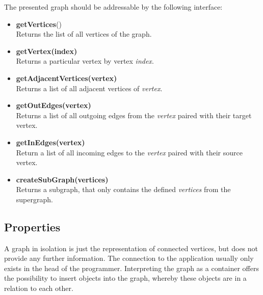 The presented graph should be addressable by the following interface:

\begin{itemize}
  \item \textbf{getVertices}()\\
    Returns the list of all vertices of the graph.
    
  \item  \textbf{getVertex(index)}\\
    Returns a particular vertex by vertex \textit{index}.

  \item  \textbf{getAdjacentVertices(vertex)}\\
    Returns a list of all adjacent vertices of \textit{vertex}.

  \item  \textbf{getOutEdges(vertex)}\\
    Returns a list of all outgoing edges from the \textit{vertex}
    paired with their target vertex.

  \item  \textbf{getInEdges(vertex)}\\
    Return a list of all incoming edges to the \textit{vertex}
    paired with their source vertex.

  \item  \textbf{createSubGraph(vertices)}\\
    Returns a subgraph, that only contains the defined
    \textit{vertices} from the supergraph.
\end{itemize}

\subsection{Properties}
A graph in isolation is just the representation of connected vertices,
but does not provide any further information. The connection to the
application usually only exists in the head of the
programmer. Interpreting the graph as a container offers the
possibility to insert objects into the graph, whereby these objects
are in a relation to each other.

